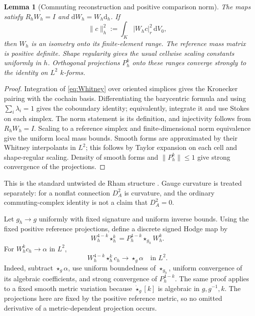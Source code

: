 \documentclass[11pt]{article}
\numberwithin{equation}{section}
\newtheorem{lemma}[lemma]{Lemma}
\theoremstyle{definition}
\theoremstyle{remark}
\newcommand{\dd}{\mathrm d}
\newcommand{\norm}[1]{\lVert#1\rVert}
\newcommand{\abs}[1]{\lvert#1\rvert}
\newcommand{\dV}{\dd V}
\begin{document}
\begin{lemma}[Commuting reconstruction and positive comparison norm]
\label{lem:Whitney}
The maps satisfy $R_hW_h=I$ and $\dd W_h=W_h\dd_h$. If
\[
 \norm c_h^2:=\int_K\abs{W_hc}_r^2\,\dV_0,
\]
then $W_h$ is an isometry onto its finite-element range. The reference mass matrix is positive definite. Shape regularity gives the usual cellwise scaling constants uniformly in $h$. Orthogonal projections $P_h^k$ onto these ranges converge strongly to the identity on $L^2$ $k$-forms.
\end{lemma}
\begin{proof}
Integration of \eqref{eq:Whitney} over oriented simplices gives the Kronecker pairing with the cochain basis. Differentiating the barycentric formula and using $\sum_i\lambda_i=1$ gives the coboundary identity; equivalently, integrate it and use Stokes on each simplex. The norm statement is its definition, and injectivity follows from $R_hW_h=I$. Scaling to a reference simplex and finite-dimensional norm equivalence give the uniform local mass bounds. Smooth forms are approximated by their Whitney interpolants in $L^2$; this follows by Taylor expansion on each cell and shape-regular scaling. Density of smooth forms and $\norm{P_h^k}\le1$ give strong convergence of the projections.
\end{proof}

This is the standard untwisted de Rham structure \cite{ArnoldFalkWinther2006,ArnoldFalkWinther2010}. Gauge curvature is treated separately: for a nonflat connection $D_A^2$ is curvature, and the ordinary commuting-complex identity is not a claim that $D_A^2=0$.

Let $g_h\to g$ uniformly with fixed signature and uniform inverse bounds. Using the fixed positive reference projections, define a discrete signed Hodge map by
\begin{equation}
 W_h^{4-k}\star_h^k
 =P_h^{4-k}\star_{g_h}W_h^k.
 \label{eq:Hodge-definition}
\end{equation}
For $W_h^kc_h\to\alpha$ in $L^2$,
\begin{equation}
 W_h^{4-k}\star_h^kc_h\longrightarrow\star_g\alpha\quad\text{in }L^2.
 \label{eq:Hodge-convergence}
\end{equation}
Indeed, subtract $\star_g\alpha$, use uniform boundedness of $\star_{g_h}$, uniform convergence of its algebraic coefficients, and strong convergence of $P_h^{4-k}$. The same proof applies to a fixed smooth metric variation because $\dot\star_g[k]$ is algebraic in $g,g^{-1},k$. The projections here are fixed by the positive reference metric, so no omitted derivative of a metric-dependent projection occurs.
\end{document}
